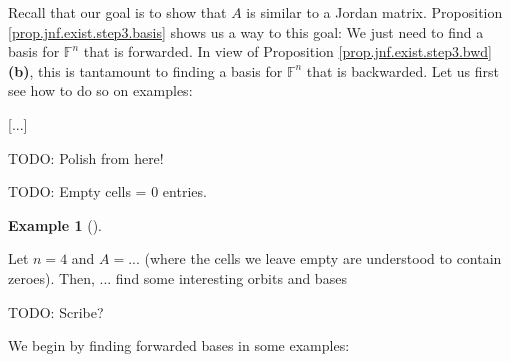 \documentclass[numbers=enddot,12pt,final,onecolumn,notitlepage]{scrartcl}%
\numberwithin{exer}{subsection}
\theoremstyle{definition}
\newtheorem{exam}[theo]{Example}
\newenvironment{example}[1][]
{\begin{exam}[#1]\begin{leftbar}}
{\end{leftbar}\end{exam}}
\begin{document}
Recall that our goal is to show that $A$ is similar to a Jordan matrix.
Proposition \ref{prop.jnf.exist.step3.basis} shows us a way to this goal: We
just need to find a basis for $\mathbb{F}^{n}$ that is forwarded. In view of
Proposition \ref{prop.jnf.exist.step3.bwd} \textbf{(b)}, this is tantamount to
finding a basis for $\mathbb{F}^{n}$ that is backwarded. Let us first see how
to do so on examples:

[...]

TODO: Polish from here!

TODO: Empty cells = $0$ entries.

\begin{example}
Let $n=4$ and $A=$... (where the cells we leave empty are understood to
contain zeroes). Then, ... find some interesting orbits and bases

TODO: Scribe?
\end{example}

We begin by finding forwarded bases in some examples:
\end{document}
